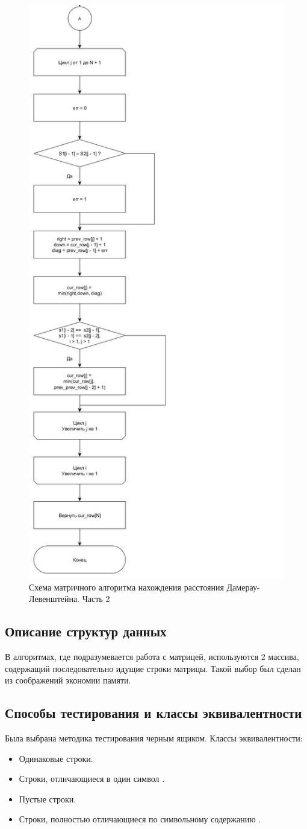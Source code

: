 \documentclass[14pt,russian]{scrartcl}
\begin{document}
\begin{figure}[h]
	\centering
	\includegraphics[width=0.65\linewidth]{damer-lev_matr_12.jpg}
	\caption{Схема матричного алгоритма нахождения расстояния Дамерау-Левенштейна. Часть 2}
	\label{fig:iter_dam_lev2}
\end{figure}

\subsection{Описание структур данных}
В алгоритмах, где подразумевается работа с матрицей, используются 2 массива, содержащий последовательно идущие строки матрицы. Такой выбор был сделан из соображений экономии памяти.

\subsection{Способы тестирования и классы эквивалентности}
Была выбрана методика тестирования черным ящиком. 
Классы эквивалентности:
\begin{itemize}
	\item Одинаковые строки.
	\item Строки, отличающиеся в один символ .
	\item Пустые строки.
	\item Строки, полностью отличающиеся по символьному содержанию .
\end{itemize}
\end{document}

